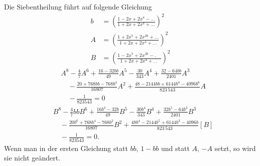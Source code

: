 \begingroup
{}
\par\indent Die Siebentheilung führt auf folgende Gleichung
\[\begin{aligned}
b&=\left(\frac{1-2x+2x^4-{.}{.}{.}}{1+2x+2x^4+{.}{.}{.}}\right)^2\\[6pt]
A&=\left(\frac{1+2x^7+2x^{28}+{.}{.}{.}}{1+2x+2x^4+{.}{.}{.}}\right)^2\\[6pt]
B&=\left(\frac{1-2x^7+2x^{28}-{.}\quad}{1+2x+2x^4+{.}\,{.}\;}\right)^2
\end{aligned}\]
\clearpage
{}
\[\begin{aligned}
&A^8-\frac47A^6+\frac{16-32bb}{49}A^5-\frac{30}{343}A^4+\frac{32-64bb}{2401}A^3\\
&\quad-\frac{20+768bb-768b^4}{16807}A^2+\frac{48-2144bb+6144b^4-4096b^6}{823\,543}A\\
&\quad-\frac1{823543}=0
\end{aligned}\]
\[\begin{aligned}
&B^8-\frac47bbB^6+\frac{16b^3-32b}{49}B^5-\frac{30b^4}{343}B^4+\frac{32b^5-64b^3}{2401}B^3\\
&\quad-\frac{20b^6+768b^4-768b^2}{16807}B^2+\frac{48b^4-2144b^5+6144b^3-4096b}{823\,543}[B]\\
&\quad-\frac1{823543}=0.
\end{aligned}\]
\noindent Wenn man in der ersten Gleichung statt $bb$, $1-bb$ und statt $A$, $-A$ setzt,
so wird sie nicht geändert.
\clearpage
\endgroup
